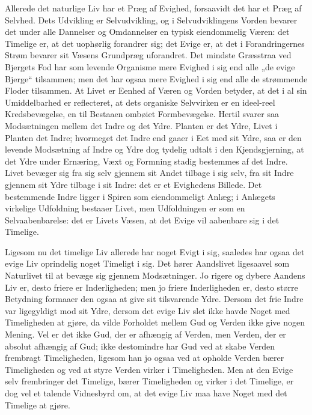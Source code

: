 \documentclass[12pt]{book}
\begin{document}
Allerede det naturlige Liv har et Præg af Evighed, forsaavidt det
har et Præg af Selvhed. Dets Udvikling er Selvudvikling, og i
Selvudviklingens Vorden bevarer det under alle Dannelser og
Omdannelser en typisk eiendommelig Væren: det Timelige er, at det
uophørlig forandrer sig; det Evige er, at det i Forandringernes
Strøm bevarer sit Væsens Grundpræg uforandret. Det mindste Græsstraa
ved Bjergets Fod har som levende Organisme mere Evighed i sig end
alle „de evige Bjerge“ tilsammen; men det har ogsaa mere Evighed i
sig end alle de strømmende Floder tilsammen. At Livet er Eenhed af
Væren og Vorden betyder, at det i al sin Umiddelbarhed er
reflecteret, at dets organiske Selvvirken er en ideel-reel
Kredsbevægelse, en til Bestaaen ombøiet Formbevægelse. Hertil svarer
saa Modsætningen mellem det Indre og det Ydre. Planten er det Ydre,
Livet i Planten det Indre; hvormeget det Indre end gaaer i Eet med
sit Ydre, saa er den levende Modsætning af Indre og Ydre dog tydelig
udtalt i den Kjendsgjerning, at det Ydre under Ernæring, Væxt og
Formning stadig bestemmes af det Indre. Livet bevæger sig fra sig
selv gjennem sit Andet tilbage i sig selv, fra sit Indre gjennem sit
Ydre tilbage i sit Indre: det er et Evighedens Billede. Det
bestemmende Indre ligger i Spiren som eiendommeligt Anlæg; i
Anlægets virkelige Udfoldning bestaaer Livet, men Udfoldningen er
som en Selvaabenbarelse: det er Livets Væsen, at det Evige vil
aabenbare sig i det Timelige.

Ligesom nu det timelige Liv allerede har noget Evigt i sig, saaledes
har ogsaa det evige Liv oprindelig noget
Timeligt i sig. Det hører Aandslivet ligesaavel som Naturlivet til
at bevæge sig gjennem Modsætninger. Jo rigere og dybere Aandens Liv
er, desto friere er Inderligheden; men jo friere Inderligheden er,
desto større Betydning formaaer den ogsaa at give sit tilsvarende
Ydre. Dersom det frie Indre var ligegyldigt mod sit Ydre, dersom det
evige Liv slet ikke havde Noget med Timeligheden at gjøre, da vilde
Forholdet mellem Gud og Verden ikke give nogen Mening. Vel er det
ikke Gud, der er afhængig af Verden, men Verden, der er absolut
afhængig af Gud; ikke destomindre har Gud ved at skabe Verden
frembragt Timeligheden, ligesom han jo ogsaa ved at opholde Verden
bærer Timeligheden og ved at styre Verden virker i Timeligheden. Men
at den Evige selv frembringer det Timelige, bærer Timeligheden og
virker i det Timelige, er dog vel et talende Vidnesbyrd om, at det
evige Liv maa have Noget med det Timelige at gjøre.
\end{document}
